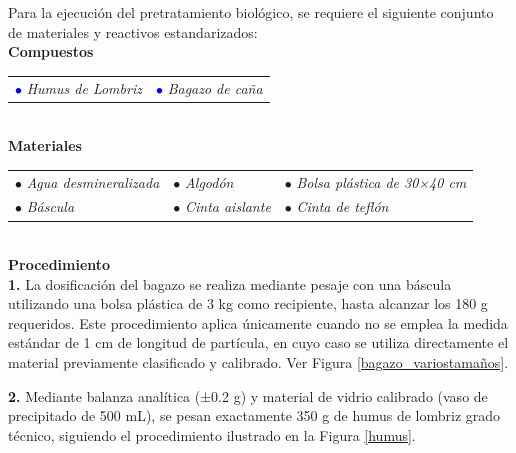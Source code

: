 \documentclass[12pt]{article}
\begin{document}
			
		Para la ejecución del pretratamiento biológico, se requiere el siguiente conjunto de materiales y reactivos estandarizados:\\
			
			\textbf{Compuestos} \\[0.5em]
			

				\begin{tabular}{p{0.3\textwidth}p{}}
				\textcolor{blue}{$\bullet$} \textit{Humus de Lombriz}  &	\textcolor{blue}{$\bullet$} \textit{Bagazo de caña}
			\end{tabular} \\[0.5em]
			
			\textbf{Materiales} \\[0.5em] 
	
			\begin{tabular}{p{}p{}p{}}
				$\bullet$ \textit{Agua desmineralizada } & $\bullet$ \textit{Algodón} & $\bullet$ \textit{Bolsa plástica de 30×40 cm }\\
				$\bullet$ \textit{Báscula} & $\bullet$ \textit{Cinta aislante} & $\bullet$ \textit{Cinta de teflón}
			\end{tabular}
			\\[1em]
			
			
			\textbf{Procedimiento}
			\\[0.5em]
			\textbf{1.}	La dosificación del bagazo se realiza mediante pesaje con una báscula utilizando una bolsa plástica de 3 kg como recipiente, hasta alcanzar los 180 g requeridos. Este procedimiento aplica únicamente cuando no se emplea la medida estándar de 1 cm de longitud de partícula, en cuyo caso se utiliza directamente el material previamente clasificado y calibrado. Ver Figura \ref{bagazo_variostamaños}.
		
			
			\textbf{2.}	Mediante balanza analítica (±0.2 g) y material de vidrio calibrado (vaso de precipitado de 500 mL), se pesan exactamente 350 g de humus de lombriz grado técnico, siguiendo el procedimiento ilustrado en la Figura \ref{humus}.
			
\end{document}
